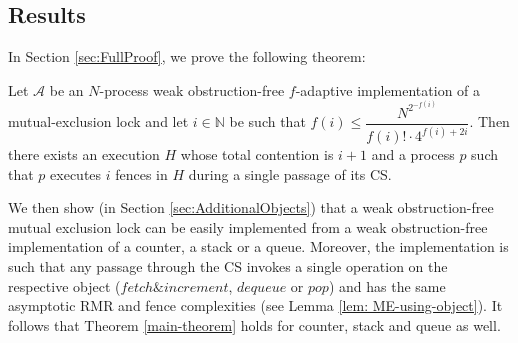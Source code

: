 \subsection{Results}

In Section \ref{sec:FullProof}, we prove the following theorem:

\begin{theorem} \label{main-theorem}
	Let $\mathcal{A}$ be an $N$-process weak obstruction-free $f$-adaptive implementation of a mutual-exclusion lock and let $i \in \mathbb{N}$ be such that $f(i) \leq \dfrac{N^{2^{-f(i)}}} {f(i)! \cdot 4^{f(i)+2i}}$.
	Then there exists an execution $H$  whose total contention is $i+1$ and a process $p$ such that $p$ executes $i$ fences in $H$ during a single passage of its CS.
\end{theorem}

We then show (in Section \ref{sec:AdditionalObjects}) that a weak obstruction-free mutual exclusion lock can be easily implemented from a weak obstruction-free implementation of a counter, a stack or a queue. Moreover, the implementation is such that any passage through the CS invokes a single operation on the respective object ($fetch \& increment$, $dequeue$ or $pop$) and has the same asymptotic RMR and fence complexities (see Lemma \ref{lem: ME-using-object}). It follows that Theorem \ref{main-theorem} holds for counter, stack and queue as well.

